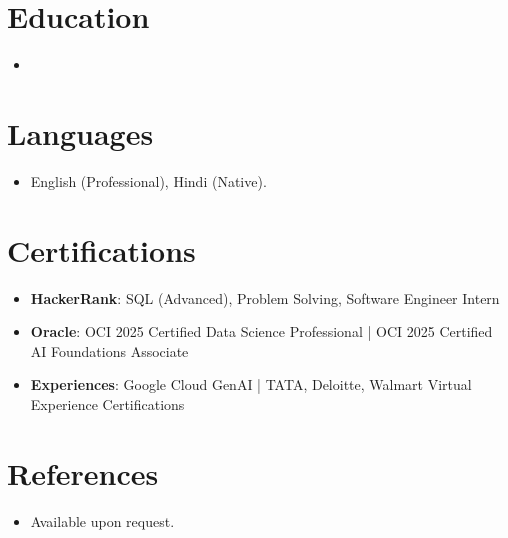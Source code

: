 \documentclass[11pt,a4paper,sans]{moderncv}
\begin{document}
\section{Education}
\vspace{1pt}
\begin{itemize}
\item{}
\end{itemize}

\section{Languages}
\vspace{1pt}
\begin{itemize}
\item English (Professional), Hindi (Native).
\end{itemize}

\section{Certifications}
\vspace{1pt}
\begin{itemize}
\item \textbf{HackerRank}: SQL (Advanced), Problem Solving, Software Engineer Intern
\item \textbf{Oracle}: OCI 2025 Certified Data Science Professional | OCI 2025 Certified AI Foundations Associate
\item \textbf{Experiences}: Google Cloud GenAI | TATA, Deloitte, Walmart Virtual Experience Certifications
\end{itemize}

\section{References}
\vspace{1pt}
\begin{itemize}
\item Available upon request.
\end{itemize}
\end{document}
